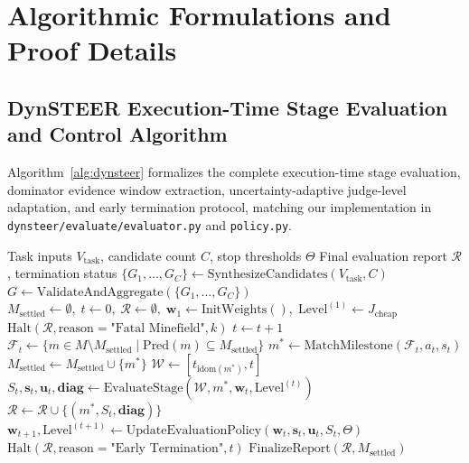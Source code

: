 \section{Algorithmic Formulations and Proof Details}
\label{app:algorithms}

\subsection{DynSTEER Execution-Time Stage Evaluation and Control Algorithm}
Algorithm~\ref{alg:dynsteer} formalizes the complete execution-time stage evaluation, dominator evidence window extraction, uncertainty-adaptive judge-level adaptation, and early termination protocol, matching our implementation in \texttt{dynsteer/evaluate/evaluator.py} and \texttt{policy.py}.

\begin{algorithm}[t]
\caption{DynSTEER Execution-Time Stage Evaluation and Control}
\label{alg:dynsteer}
\begin{algorithmic}[1]
\REQUIRE Task inputs $V_{\text{task}}$, candidate count $C$, stop thresholds $\Theta$
\ENSURE Final evaluation report $\mathcal{R}$, termination status
\STATE $\{G_1, \dots, G_C\} \leftarrow \text{SynthesizeCandidates}(V_{\text{task}}, C)$
\STATE $G \leftarrow \text{ValidateAndAggregate}(\{G_1, \dots, G_C\})$ 
\STATE $M_{\text{settled}} \leftarrow \emptyset, \; t \leftarrow 0, \; \mathcal{R} \leftarrow \emptyset, \; \mathbf{w}_1 \leftarrow \text{InitWeights}(), \; \text{Level}^{(1)} \leftarrow J_{\text{cheap}}$
        \RETURN $\text{Halt}(\mathcal{R}, \text{reason}=\text{"Fatal Minefield"}, k)$
    \ENDIF
        \STATE $t \leftarrow t + 1$
        \STATE $\mathcal{F}_t \leftarrow \{m \in M \setminus M_{\text{settled}} \mid \text{Pred}(m) \subseteq M_{\text{settled}}\}$
        \STATE $m^* \leftarrow \text{MatchMilestone}(\mathcal{F}_t, a_t, s_t)$
            \STATE $M_{\text{settled}} \leftarrow M_{\text{settled}} \cup \{m^*\}$
            \STATE $\mathcal{W} \leftarrow [t_{\text{idom}(m^*)}, t]$ 
            \STATE $S_t, \mathbf{s}_t, \mathbf{u}_t, \mathbf{diag} \leftarrow \text{EvaluateStage}(\mathcal{W}, m^*, \mathbf{w}_t, \text{Level}^{(t)})$
            \STATE $\mathcal{R} \leftarrow \mathcal{R} \cup \{(m^*, S_t, \mathbf{diag})\}$
            \STATE $\mathbf{w}_{t+1}, \text{Level}^{(t+1)} \leftarrow \text{UpdateEvaluationPolicy}(\mathbf{w}_t, \mathbf{s}_t, \mathbf{u}_t, S_t, \Theta)$ 
        \ENDIF
            \RETURN $\text{Halt}(\mathcal{R}, \text{reason}=\text{"Early Termination"}, t)$
        \ENDIF
    \ENDIF
\ENDFOR
\RETURN $\text{FinalizeReport}(\mathcal{R}, M_{\text{settled}})$
\end{algorithmic}
\end{algorithm}

